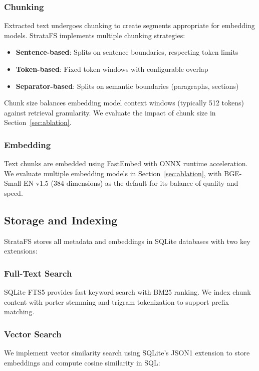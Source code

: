 \documentclass[conference]{IEEEtran}
\begin{document}
\subsubsection{Chunking}
Extracted text undergoes chunking to create segments appropriate for embedding models. StrataFS implements multiple chunking strategies:

\begin{itemize}
    \item \textbf{Sentence-based}: Splits on sentence boundaries, respecting token limits
    \item \textbf{Token-based}: Fixed token windows with configurable overlap
    \item \textbf{Separator-based}: Splits on semantic boundaries (paragraphs, sections)
\end{itemize}

Chunk size balances embedding model context windows (typically 512 tokens) against retrieval granularity. We evaluate the impact of chunk size in Section~\ref{sec:ablation}.

\subsubsection{Embedding}
Text chunks are embedded using FastEmbed with ONNX runtime acceleration. We evaluate multiple embedding models in Section~\ref{sec:ablation}, with BGE-Small-EN-v1.5 (384 dimensions) as the default for its balance of quality and speed.

\subsection{Storage and Indexing}

StrataFS stores all metadata and embeddings in SQLite databases with two key extensions:

\subsubsection{Full-Text Search}
SQLite FTS5 provides fast keyword search with BM25 ranking. We index chunk content with porter stemming and trigram tokenization to support prefix matching.

\subsubsection{Vector Search}
We implement vector similarity search using SQLite's JSON1 extension to store embeddings and compute cosine similarity in SQL:
\end{document}

